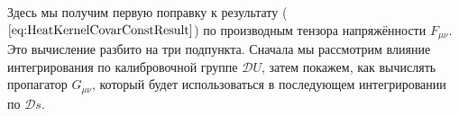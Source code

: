 
Здесь мы получим первую поправку к результату ($\ref{eq:HeatKernelCovarConstResult}$) по производным тензора напряжённости $F_{\mu \nu}$. Это вычисление разбито на три подпункта. Сначала мы рассмотрим влияние интегрирования по калибровочной группе $\mathcal{D}U$, затем покажем, как вычислять пропагатор $G_{\mu \nu}$, который будет использоваться в последующем интегрировании по $\mathcal{D}s$.